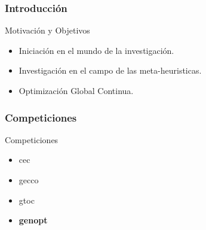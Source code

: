 \begin{frame}

\frametitle{Introducción}

\begin{block}{Motivación y Objetivos}
\begin{itemize}
	\item Iniciación en el mundo de la investigación.
	\item Investigación en el campo de las meta-heuristicas.
	\item Optimización Global Continua.
\end{itemize}
\end{block}
\end{frame}

\begin{frame}

\frametitle{Competiciones}

\begin{block}{Competiciones}
  \begin{itemize}
  \item\gls{cec}
  \item\gls{gecco}
  \item\gls{gtoc} 
  \Fontvi
  \item\textbf{\gls{genopt}}
  \end{itemize}
\end{block}

\end{frame}